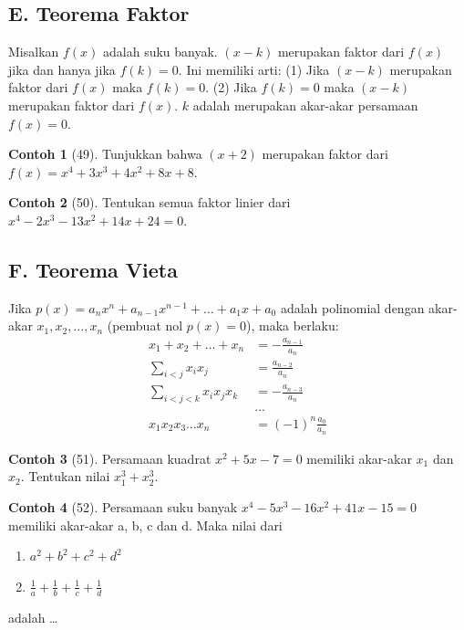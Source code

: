 \documentclass[12pt]{scrartcl}
\theoremstyle{definition}
\newtheorem{contoh}{Contoh}
\begin{document}
\subsection*{E. Teorema Faktor}
Misalkan $f(x)$ adalah suku banyak. $(x-k)$ merupakan faktor dari $f(x)$ jika dan hanya jika $f(k)=0$. 
Ini memiliki arti: 
(1) Jika $(x-k)$ merupakan faktor dari $f(x)$ maka $f(k)=0$. 
(2) Jika $f(k)=0$ maka $(x-k)$ merupakan faktor dari $f(x)$. 
$k$ adalah merupakan akar-akar persamaan $f(x)=0$. 

\begin{contoh}[49]
Tunjukkan bahwa $(x+2)$ merupakan faktor dari $f(x) = x^4 + 3x^3 + 4x^2 + 8x + 8$.
\end{contoh}

\begin{contoh}[50]
Tentukan semua faktor linier dari $x^4 - 2x^3 - 13x^2 + 14x + 24 = 0$.
\end{contoh}

\subsection*{F. Teorema Vieta}
Jika $p(x) = a_n x^n + a_{n-1} x^{n-1} + \dots + a_1 x + a_0$ adalah polinomial dengan akar-akar $x_1, x_2, \dots, x_n$ (pembuat nol $p(x)=0$), maka berlaku: 
\begin{align*}
    x_1 + x_2 + \dots + x_n &= -\frac{a_{n-1}}{a_n} \\
    \sum_{i<j} x_i x_j &= \frac{a_{n-2}}{a_n} \\
    \sum_{i<j<k} x_i x_j x_k &= -\frac{a_{n-3}}{a_n} \\
    &\dots \\
    x_1 x_2 x_3 \dots x_n &= (-1)^n \frac{a_0}{a_n}
\end{align*}

\begin{contoh}[51]
Persamaan kuadrat $x^2+5x-7=0$ memiliki akar-akar $x_1$ dan $x_2$. Tentukan nilai $x_1^3 + x_2^3$.
\end{contoh}

\begin{contoh}[52]
Persamaan suku banyak $x^4 - 5x^3 - 16x^2 + 41x - 15 = 0$ memiliki akar-akar a, b, c dan d. Maka nilai dari
\begin{enumerate}
    \item[a.] $a^2+b^2+c^2+d^2$
    \item[b.] $\frac{1}{a}+\frac{1}{b}+\frac{1}{c}+\frac{1}{d}$
\end{enumerate}
adalah \dots
\end{contoh}
\end{document}
